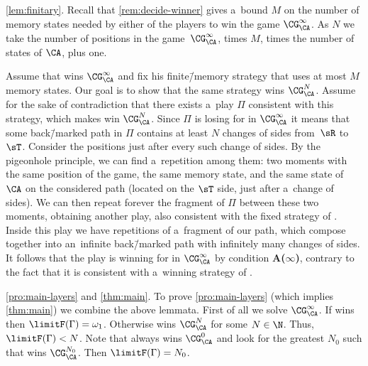 \documentclass{lmcs}
\numberwithin{equation}{section}
\numberwithin{figure}{section}
\newcommand{\itemfont}[1]{\textbf{#1}}
\begin{document}
\begin{proofof}{\cref{lem:finitary}.}
	Recall that \cref{rem:decide-winner} gives a~bound $M$ on the number of memory states needed by either of the players to win the game $\CG^\infty_\CA$.
	As $N$ we take the number of positions in the game~$\CG^\infty_\CA$, times $M$, times the number of states of $\CA$, plus one.
	
	Assume that \adam wins $\CG^\infty_\CA$ and fix his finite\=/memory strategy that uses at most $M$ memory states.
	Our goal is to show that the same strategy wins $\CG^N_\CA$.
	Assume for the sake of contradiction that there exists a~play $\Pi$ consistent with this strategy, which makes \eve win $\CG^N_\CA$.
	Since $\Pi$ is losing for \eve in $\CG^\infty_\CA$ it means that
	some back\=/marked path in $\Pi$ contains at least $N$ changes of sides from~$\sR$ to $\sT$.
	Consider the positions just after every such change of sides.
	By the pigeonhole principle, we can find a~repetition among them:
	two moments with the same position of the game, the same memory state, and the same state of $\CA$ on the considered path
	(located on the $\sT$ side, just after a~change of sides).
	We can then repeat forever the fragment of $\Pi$ between these two moments, obtaining another play, also consistent with the fixed strategy of \adam.
	Inside this play we have repetitions of a~fragment of our path, which compose together into an~infinite back\=/marked path with infinitely many changes of sides.
	It follows that the play is winning for \eve in $\CG^\infty_\CA$ by condition \itemfont{A($\infty$)}, contrary to the fact that it is consistent with a~winning strategy of \adam.
\end{proofof}

\begin{proofof}{\cref{pro:main-layers} and \cref{thm:main}.}
	To prove \cref{pro:main-layers} (which implies \cref{thm:main}) we combine the above lemmata.
	First of all we solve $\CG^\infty_\CA$.
	If \eve wins then $\limitF(\Gamma)=\omega_1$.
	Otherwise \adam wins $\CG^N_\CA$ for some $N\in\N$.
	Thus, $\limitF(\Gamma)<N$.
	Note that \eve always wins $\CG^0_\CA$ and look for the greatest $N_0$ such that \eve wins $\CG^{N_0}_\CA$. Then $\limitF(\Gamma)=N_0$.
\end{proofof}
\end{document}
